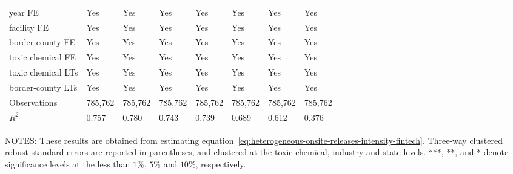 \begin{table}[H]
{\begin{tabular}{@{}llllllll@{}}
            year FE                         & Yes       & Yes           & Yes       & Yes          & Yes             & Yes           & Yes                 \\
            facility FE                     & Yes       & Yes           & Yes       & Yes          & Yes             & Yes           & Yes                 \\
            border-county FE                & Yes       & Yes           & Yes       & Yes          & Yes             & Yes           & Yes                 \\
            toxic chemical FE               & Yes       & Yes           & Yes       & Yes          & Yes             & Yes           & Yes                 \\
            toxic chemical LTs              & Yes       & Yes           & Yes       & Yes          & Yes             & Yes           & Yes                 \\
            border-county LTs               & Yes       & Yes           & Yes       & Yes          & Yes             & Yes           & Yes                 \\\midrule
            Observations                    & 785,762   & 785,762       & 785,762   & 785,762      & 785,762         & 785,762       & 785,762             \\
            $R^2$                           & 0.757     & 0.780         & 0.743     & 0.739        & 0.689           & 0.612         & 0.376               \\ \bottomrule \bottomrule
        \end{tabular}%
    }
    \begin{minipage}{\columnwidth}
        \vspace{0.05in}
        \tiny NOTES: These results are obtained from estimating equation~\ref{eq:heterogeneous-onsite-releases-intensity-fintech}. Three-way clustered robust standard errors are reported in parentheses, and clustered at the toxic chemical, industry and state levels. ***, **, and * denote significance levels at the less than $1\%$, $5\%$ and $10\%$, respectively.
    \end{minipage}
\end{table}